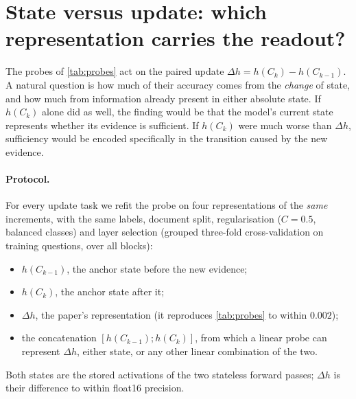 \section{State versus update: which representation carries the readout?}
\label{app:rep}

The probes of \cref{tab:probes} act on the paired update $\Delta h=h(C_k)-h(C_{k-1})$. A natural question is how much of their accuracy comes from the \emph{change} of state, and how much from information already present in either absolute state. If $h(C_k)$ alone did as well, the finding would be that the model's current state represents whether its evidence is sufficient. If $h(C_k)$ were much worse than $\Delta h$, sufficiency would be encoded specifically in the transition caused by the new evidence.

\paragraph{Protocol.} For every update task we refit the probe on four representations of the \emph{same} increments, with the same labels, document split, regularisation ($C=0.5$, balanced classes) and layer selection (grouped three-fold cross-validation on training questions, over all blocks):
\begin{itemize}
  \item $h(C_{k-1})$, the anchor state before the new evidence;
  \item $h(C_k)$, the anchor state after it;
  \item $\Delta h$, the paper's representation (it reproduces \cref{tab:probes} to within $0.002$);
  \item the concatenation $[h(C_{k-1});h(C_k)]$, from which a linear probe can represent $\Delta h$, either state, or any other linear combination of the two.
\end{itemize}
Both states are the stored activations of the two stateless forward passes; $\Delta h$ is their difference to within float16 precision.

\begin{table}[h]
\centering\small

\caption{Held-out AUROC (document split, best layer by inner cross-validation) of probes for each update task, fitted on four representations of the same increments. Bold: best per row.}
\label{tab:rep_ablation}
\end{table}

